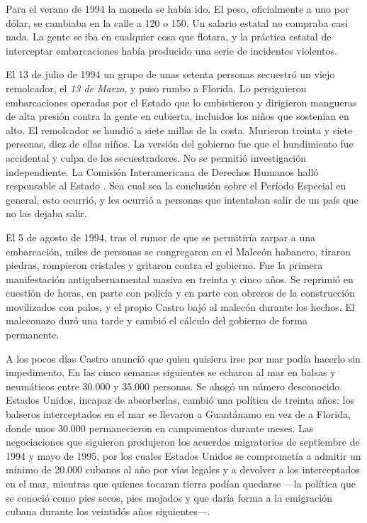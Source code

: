 Para el verano de 1994 la moneda se había ido. El peso, oficialmente a uno por
dólar, se cambiaba en la calle a 120 o 150. Un salario estatal no compraba casi
nada. La gente se iba en cualquier cosa que flotara, y la práctica estatal de
interceptar embarcaciones había producido una serie de incidentes violentos.

El 13 de julio de 1994 un grupo de unas setenta personas secuestró un viejo
remolcador, el \emph{13 de Marzo}, y puso rumbo a Florida. Lo persiguieron
embarcaciones operadas por el Estado que lo embistieron y dirigieron mangueras de
alta presión contra la gente en cubierta, incluidos los niños que sostenían en
alto. El remolcador se hundió a siete millas de la costa. Murieron treinta y
siete personas, diez de ellas niños.\unv{} La versión del gobierno fue que el
hundimiento fue accidental y culpa de los secuestradores. No se permitió
investigación independiente. La Comisión Interamericana de Derechos Humanos halló
responsable al Estado \citep{iachr1996}. Sea cual sea la conclusión sobre el
Período Especial en general, esto ocurrió, y les ocurrió a personas que intentaban
salir de un país que no las dejaba salir.

El 5 de agosto de 1994, tras el rumor de que se permitiría zarpar a una
embarcación, miles de personas se congregaron en el Malecón habanero, tiraron
piedras, rompieron cristales y gritaron contra el gobierno. Fue la primera
manifestación antigubernamental masiva en treinta y cinco años. Se reprimió en
cuestión de horas, en parte con policía y en parte con obreros de la construcción
movilizados con palos, y el propio Castro bajó al malecón durante los hechos. El
maleconazo duró una tarde y cambió el cálculo del gobierno de forma permanente.

A los pocos días Castro anunció que quien quisiera irse por mar podía hacerlo sin
impedimento. En las cinco semanas siguientes se echaron al mar en balsas y
neumáticos entre 30.000 y 35.000 personas.\unv{} Se ahogó un número desconocido.
Estados Unidos, incapaz de absorberlas, cambió una política de treinta años: los
balseros interceptados en el mar se llevaron a Guantánamo en vez de a Florida,
donde unos 30.000 permanecieron en campamentos durante meses. Las negociaciones
que siguieron produjeron los acuerdos migratorios de septiembre de 1994 y mayo de
1995, por los cuales Estados Unidos se comprometía a admitir un mínimo de 20.000
cubanos al año por vías legales y a devolver a los interceptados en el mar,
mientras que quienes tocaran tierra podían quedarse ---la política que se conoció
como pies secos, pies mojados y que daría forma a la emigración cubana durante los
veintidós años siguientes---.

